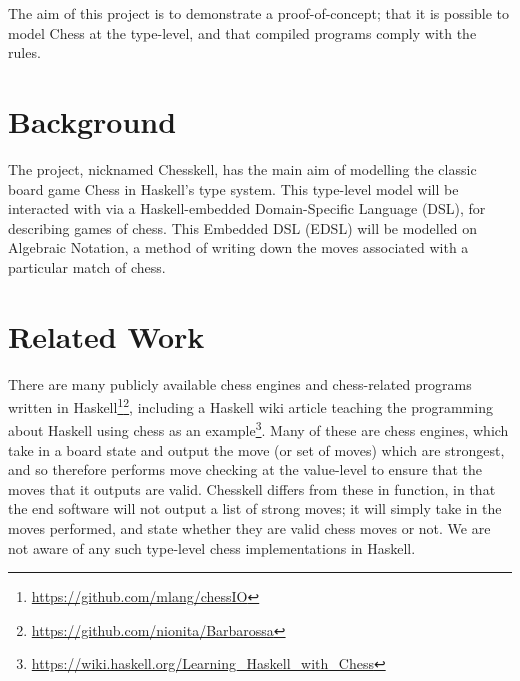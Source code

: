 \documentclass[12pt, a4paper]{scrartcl}
\begin{document}
The aim of this project is to demonstrate a proof-of-concept; that it is possible to model Chess at the type-level, and that compiled programs comply with the rules.

\section{Background}

The project, nicknamed Chesskell, has the main aim of modelling the classic board game Chess in Haskell's type system. This type-level model will be interacted with via a Haskell-embedded Domain-Specific Language (DSL), for describing games of chess. This Embedded DSL (EDSL) will be modelled on Algebraic Notation, a method of writing down the moves associated with a particular match of chess.



\section{Related Work}

There are many publicly available chess engines and chess-related programs written in Haskell\footnote{\url{https://github.com/mlang/chessIO}}\footnote{\url{https://github.com/nionita/Barbarossa}}, including a Haskell wiki article teaching the programming about Haskell using chess as an example\footnote{\url{https://wiki.haskell.org/Learning_Haskell_with_Chess}}. Many of these are chess engines, which take in a board state and output the move (or set of moves) which are strongest, and so therefore performs move checking at the value-level to ensure that the moves that it outputs are valid. Chesskell differs from these in function, in that the end software will not output a list of strong moves; it will simply take in the moves performed, and state whether they are valid chess moves or not. We are not aware of any such type-level chess implementations in Haskell.
\end{document}
